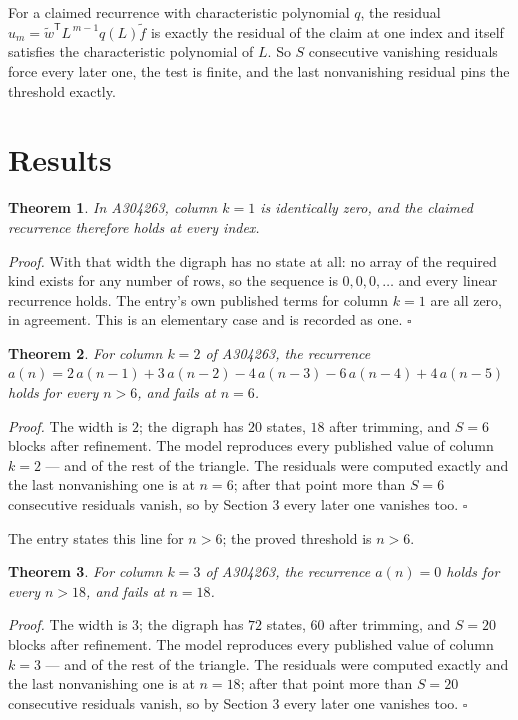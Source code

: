 \documentclass[11pt]{article}
\newtheorem{theorem}{Theorem}
\theoremstyle{definition}
\begin{document}
For a claimed recurrence with characteristic polynomial $q$, the residual $u_m = \tilde w^{\mathsf T}L^{\,m-1}q(L)\tilde f$ is exactly the residual of the claim at one index and itself satisfies the characteristic polynomial of $L$. So $S$ consecutive vanishing residuals force every later one, the test is finite, and the last nonvanishing residual pins the threshold exactly.

\section{Results}

\begin{theorem} In A304263, column $k = 1$ is identically zero, and the claimed recurrence therefore holds at every index.\end{theorem}

{\itshape Proof.} With that width the digraph has no state at all: no array of the required kind exists for any number of rows, so the sequence is $0,0,0,\dots$ and every linear recurrence holds. The entry's own published terms for column $k = 1$ are all zero, in agreement. This is an elementary case and is recorded as one. $\square$

\begin{theorem} For column $k = 2$ of A304263, the recurrence $a(n) = 2\,a(n-1) + 3\,a(n-2) - 4\,a(n-3) - 6\,a(n-4) + 4\,a(n-5)$ holds for every $n > 6$, and fails at $n = 6$.\end{theorem}

{\itshape Proof.} The width is $2$; the digraph has $20$ states, $18$ after trimming, and $S = 6$ blocks after refinement. The model reproduces every published value of column $k = 2$ --- and of the rest of the triangle. The residuals were computed exactly and the last nonvanishing one is at $n = 6$; after that point more than $S = 6$ consecutive residuals vanish, so by Section 3 every later one vanishes too. $\square$

The entry states this line for $n > 6$; the proved threshold is $n > 6$.

\begin{theorem} For column $k = 3$ of A304263, the recurrence $a(n) = 0$ holds for every $n > 18$, and fails at $n = 18$.\end{theorem}

{\itshape Proof.} The width is $3$; the digraph has $72$ states, $60$ after trimming, and $S = 20$ blocks after refinement. The model reproduces every published value of column $k = 3$ --- and of the rest of the triangle. The residuals were computed exactly and the last nonvanishing one is at $n = 18$; after that point more than $S = 20$ consecutive residuals vanish, so by Section 3 every later one vanishes too. $\square$
\end{document}
